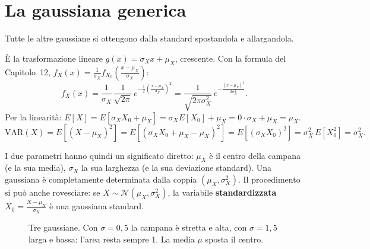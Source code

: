 \section{La gaussiana generica}

Tutte le altre gaussiane si ottengono dalla standard spostandola e allargandola.


\begin{dimostrazione}
 È la trasformazione lineare $g(x) = \sigma_X x + \mu_X$, crescente. Con la formula del
Capitolo~12, $f_X(x) = \frac{1}{\sigma_X} f_{X_0}\left( \frac{x - \mu_X}{\sigma_X} \right)$:
\[ f_X(x) = \frac{1}{\sigma_X}\, \frac{1}{\sqrt{2\pi}}\, e^{-\frac{1}{2}\left( \frac{x - \mu_X}{\sigma_X} \right)^2} =
   \frac{1}{\sqrt{2\pi\sigma_X^2}}\, e^{-\frac{(x - \mu_X)^2}{2\sigma_X^2}} . \]
 Per la linearità: $E[X] = E[\sigma_X X_0 + \mu_X] = \sigma_X E[X_0] + \mu_X = 0 \cdot \sigma_X + \mu_X =
\mu_X$.
\[ \mathrm{VAR}(X) = E[(X - \mu_X)^2] = E[(\sigma_X X_0 + \mu_X - \mu_X)^2] = E[(\sigma_X X_0)^2] = \sigma_X^2\, E[X_0^2] =
   \sigma_X^2 . \]
\end{dimostrazione}

I due parametri hanno quindi un significato diretto: $\mu_X$ è il centro della campana (e la sua media), $\sigma_X$ la
sua larghezza (e la sua deviazione standard). Una gaussiana è completamente determinata dalla coppia
$(\mu_X, \sigma_X^2)$. Il procedimento si può anche rovesciare: se $X \sim \mathcal{N}(\mu_X, \sigma_X^2)$, la variabile
\textbf{standardizzata} $X_0 = \frac{X - \mu_X}{\sigma_X}$ è una gaussiana standard.

\begin{figure}[H]
\centering
{}
\caption{Tre gaussiane. Con $\sigma = 0{,}5$ la campana è stretta e alta, con $\sigma = 1{,}5$ larga e bassa: l'area resta
sempre 1. La media $\mu$ sposta il centro.}
\end{figure}

